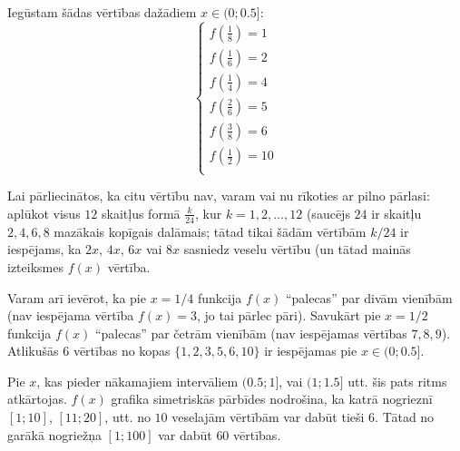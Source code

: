 \documentclass[a4paper,12pt]{article}
\begin{document}
\begin{problem}
{Iegūstam šādas vērtības dažādiem $x \in (0;0.5]$:
\[ \left\{ \begin{array}{l}
f\left( \frac{1}{8} \right) = 1\\[2pt]
f\left( \frac{1}{6} \right) = 2\\[2pt]
f\left( \frac{1}{4} \right) = 4\\[2pt]
f\left( \frac{2}{6} \right) = 5\\[2pt]
f\left( \frac{3}{8} \right) = 6\\[2pt]
f\left( \frac{1}{2} \right) = 10\\
\end{array} \right. \]

Lai pārliecinātos, ka citu vērtību nav, varam vai nu rīkoties ar pilno pārlasi: aplūkot visus $12$ skaitļus
formā $\frac{k}{24}$, kur $k=1,2,\ldots,12$ (saucējs $24$ ir skaitļu $2,4,6,8$ mazākais kopīgais dalāmais; tātad
tikai šādām vērtībām $k/24$ ir iespējams, ka $2x$, $4x$, $6x$ vai $8x$ sasniedz veselu vērtību (un tātad mainās
izteiksmes $f(x)$ vērtība. 

Varam arī ievērot, ka pie $x = 1/4$ funkcija $f(x)$ ``palecas'' par divām vienībām (nav iespējama vērtība $f(x) = 3$, jo 
tai pārlec pāri). Savukārt pie $x = 1/2$ funkcija $f(x)$ ``palecas'' par četrām vienībām (nav iespējamas vērtības $7,8,9$). 
Atlikušās $6$ vērtības no kopas $\{1,2,3,5,6,10\}$ ir iespējamas pie $x \in (0;0.5]$. 

Pie $x$, kas pieder nākamajiem intervāliem $(0.5;1]$, vai $(1;1.5]$ utt. šis pats ritms atkārtojas. $f(x)$ grafika simetriskās
pārbīdes nodrošina, ka 
katrā nogrieznī $[1;10]$, $[11;20]$, utt. no $10$ veselajām vērtībām var dabūt tieši $6$. Tātad no garākā nogriežņa $[1;100]$
var dabūt $60$ vērtības.
%
}
\end{problem}
\end{document}

